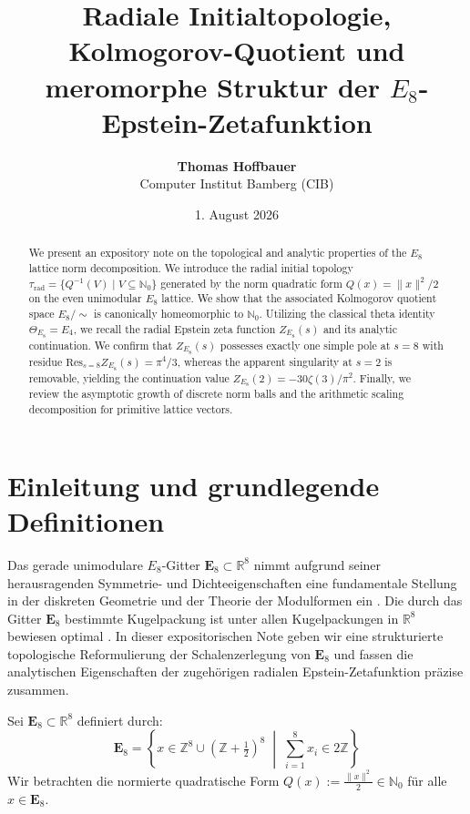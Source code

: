 \documentclass[11pt,a4paper]{article}
\title{\textbf{Radiale Initialtopologie, Kolmogorov-Quotient und meromorphe Struktur der $E_8$-Epstein-Zetafunktion}}
\author{\textbf{Thomas Hoffbauer} \\ \small Computer Institut Bamberg (CIB)}
\date{1. August 2026}
\begin{document}
	
	\maketitle
	
	\begin{abstract}
		We present an expository note on the topological and analytic properties of the $E_8$ lattice norm decomposition. We introduce the radial initial topology $\tau_{\text{rad}} = \{Q^{-1}(V) \mid V \subseteq \mathbb{N}_0\}$ generated by the norm quadratic form $Q(x) = \|x\|^2/2$ on the even unimodular $E_8$ lattice. We show that the associated Kolmogorov quotient space $E_8 / \sim$ is canonically homeomorphic to $\mathbb{N}_0$. Utilizing the classical theta identity $\Theta_{E_8} = E_4$, we recall the radial Epstein zeta function $Z_{E_8}(s)$ and its analytic continuation. We confirm that $Z_{E_8}(s)$ possesses exactly one simple pole at $s=8$ with residue $\text{Res}_{s=8} Z_{E_8}(s) = \pi^4 / 3$, whereas the apparent singularity at $s=2$ is removable, yielding the continuation value $Z_{E_8}(2) = -30\zeta(3)/\pi^2$. Finally, we review the asymptotic growth of discrete norm balls and the arithmetic scaling decomposition for primitive lattice vectors.
	\end{abstract}
	
	
	\section{Einleitung und grundlegende Definitionen}
	
	Das gerade unimodulare $E_8$-Gitter $\mathbf{E}_8 \subset \mathbb{R}^8$ nimmt aufgrund seiner herausragenden Symmetrie- und Dichteeigenschaften eine fundamentale Stellung in der diskreten Geometrie und der Theorie der Modulformen ein \cite{serre1973, conway1999}. Die durch das Gitter $\mathbf{E}_8$ bestimmte Kugelpackung ist unter allen Kugelpackungen in $\mathbb{R}^8$ bewiesen optimal \cite{viazovska2017}. In dieser expositorischen Note geben wir eine strukturierte topologische Reformulierung der Schalenzerlegung von $\mathbf{E}_8$ und fassen die analytischen Eigenschaften der zugehörigen radialen Epstein-Zetafunktion präzise zusammen.
	
	Sei $\mathbf{E}_8 \subset \mathbb{R}^8$ definiert durch:
	$$\mathbf{E}_8 = \left\{ x \in \mathbb{Z}^8 \cup \left(\mathbb{Z} + \tfrac{1}{2}\right)^8 \;\middle|\; \sum_{i=1}^8 x_i \in 2\mathbb{Z} \right\}$$
	Wir betrachten die normierte quadratische Form $Q(x) := \frac{\|x\|^2}{2} \in \mathbb{N}_0$ für alle $x \in \mathbf{E}_8$.
	
\end{document}
